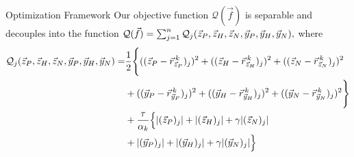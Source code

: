 \documentclass[10pt, t]{beamer}
\begin{document}
\begin{frame}{Optimization Framework}
	Our objective function $\mathcal{Q}(\vec{f})$ is separable and decouples into the function
	$\mathcal{Q}(\vec{f}) = \sum_{j=1}^{n} \mathcal{Q}_j(\vec{z}_P, \vec{z}_H, \vec{z}_N, \vec{y}_P, \vec{y}_H, \vec{y}_N),$
	where
			\begin{align*}
			\mathcal{Q}_j(\vec{z}_P, \vec{z}_H, \vec{z}_N, \vec{y}_P, \vec{y}_H, \vec{y}_N) = 
				&\frac{1}{2}\Bigg\{
				((\vec{z}_P - \vec{r}_{\vec{z}_P}^{\, k})_j)^2 + 
				((\vec{z}_H - \vec{r}_{\vec{z}_H}^{\, k})_j)^2 +
				((\vec{z}_N - \vec{r}_{\vec{z}_N}^{\, k})_j)^2 \\ 
				&+ 
				((\vec{y}_P - \vec{r}_{\vec{y}_P}^{\, k})_j)^2 + 
				((\vec{y}_H - \vec{r}_{\vec{y}_H}^{\, k})_j)^2 +
				((\vec{y}_N - \vec{r}_{\vec{y}_N}^{\, k})_j)^2 \Bigg\} \\
				&+
				\frac{\tau}{\alpha_k} \Big\{ |(\vec{z}_P)_j| + 
				|(\vec{z}_H)_j| + \gamma |(\vec{z}_N)_j| \\
				&+ 
				|(\vec{y}_P)_j| +  |(\vec{y}_H)_j| + \gamma |(\vec{y}_N)_j|\Big\}
			\end{align*}
\end{frame}
\end{document}
